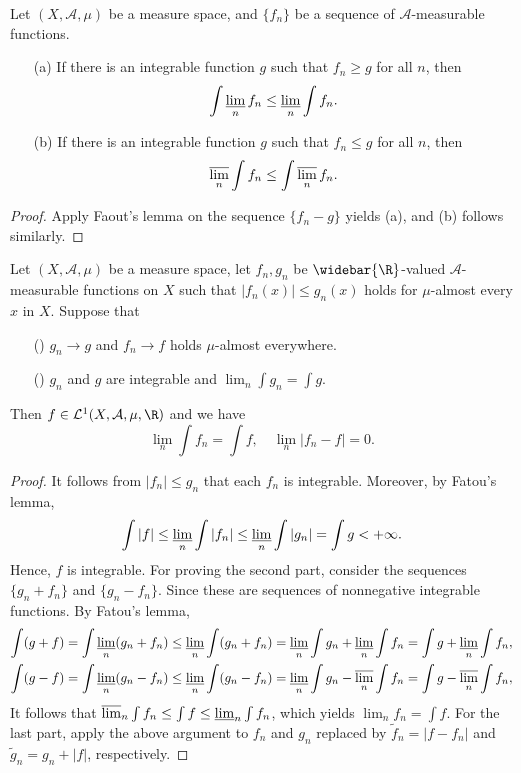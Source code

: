 \begin{proposition}
Let $(X,\mathcal{A},\mu)$ be a measure space, and $\{f_n\}$ be a sequence of $\mathcal{A}$-measurable functions.
\begin{itemize}
\item[(a)] If there is an integrable function $g$ such that $f_n\geq g$ for all $n$, then
\[\int\varliminf_n f_n\leq\varliminf_n\int f_n.\] 
\item[(b)] If there is an integrable function $g$ such that $f_n\leq g$ for all $n$, then
\[\varlimsup_n\int f_n\leq\int\varlimsup_n f_n.\] 
\end{itemize}
\end{proposition}
\begin{proof}
Apply Faout's lemma on the sequence $\{f_n-g\}$ yields (a), and (b) follows similarly.
\end{proof}
\begin{theorem}
Let $(X,\mathcal{A},\mu)$ be a measure space, let $f_n,g_n$ be $\widebar{\R}$-valued $\mathcal{A}$-measurable functions on $X$ such that $|f_n(x)|\leq g_n(x)$ holds for $\mu$-almost every $x$ in $X$. Suppose that
\begin{itemize}
\item[(\rmnum{1})] $g_n\to g$ and $f_n\to f$ holds $\mu$-almost everywhere.
\item[(\rmnum{2})] $g_n$ and $g$ are integrable and $\lim_n\int g_n=\int g$.
\end{itemize}
Then $f\in\mathcal{L}^1(X,\mathcal{A},\mu,\R)$ and we have
\[\lim_n\int f_n=\int f,\quad \lim_n|f_n-f|=0.\]
\end{theorem}
\begin{proof}
It follows from $|f_n|\leq g_n$ that each $f_n$ is integrable. Moreover, by Fatou's lemma,
\[\int|f|\leq\varliminf_n\int|f_n|\leq\varliminf_n\int|g_n|=\int g<+\infty.\]
Hence, $f$ is integrable. For proving the second part, consider the sequences $\{g_n+f_n\}$ and $\{g_n-f_n\}$. Since these are sequences of
nonnegative integrable functions. By Fatou's lemma,
\begin{align*}
\int(g+f)=\int\varliminf_n(g_n+f_n)\leq\varliminf_n\int(g_n+f_n)=\varliminf_n\int g_n+\varliminf_n\int f_n=\int g+\varliminf_n\int f_n,\\
\int(g-f)=\int\varliminf_n(g_n-f_n)\leq\varliminf_n\int(g_n-f_n)=\varliminf_n\int g_n-\varlimsup_n\int f_n=\int g-\varlimsup_n\int f_n,
\end{align*}
It follows that $\varlimsup_n\int f_n\leq \int f\leq\varliminf_n\int f_n$, which yields $\lim_nf_n=\int f$. For the last part, apply the above argument to $f_n$ and $g_n$ replaced by $\widetilde{f}_n=|f-f_n|$ and $\widetilde{g}_n=g_n+|f|$,
respectively.
\end{proof}
